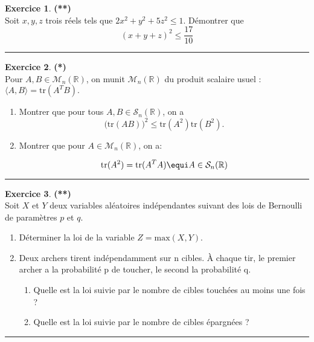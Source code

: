 \documentclass[a4paper,11pt]{article}
\theoremstyle{definition}
\newtheorem{exo}{Exercice} %
\begin{document}
\begin{exo}\textbf{(**)}\quad\\[0.25cm]%
	Soit $x,y,z$ trois réels tels que $2x^2+y^2+5z^2\leq 1$. Démontrer que $$(x+y+z)^2\leq\frac {17}{10}$$
	
	\centering
	\rule{1\linewidth}{0.6pt}
\end{exo}
\newpage 

\begin{exo}\textbf{(*)}\quad\\[0.25cm]%
	Pour $A,B\in\mathcal M_n(\mathbb R)$, on munit $\mathcal M_n(\mathbb R)$ du produit scalaire usuel : $ \displaystyle \langle A,B\rangle=\textrm{tr}(A^T B).$
	\begin{enumerate}
		\item Montrer que pour tous $A,B\in\mathcal S_n(\mathbb R)$, on a
		$$\big(\textrm{tr}(AB)\big)^2\leq \textrm{tr}(A^2)\textrm{tr}(B^2).$$
		\item Montrer que pour $A\in \mathcal M_n(\mathbb R)$, on a:
		
		$$\textrm{tr}(A^2) = \textrm{tr}(A^TA)  \equi A\in\mathcal S_n(\mathbb R)$$
	\end{enumerate}
	
	\centering
	\rule{1\linewidth}{0.6pt}
\end{exo}


\begin{exo}\textbf{(**)}\quad\\[0.25cm]%
	Soit $X$ et $Y$ deux variables aléatoires indépendantes suivant des lois de
	Bernoulli de paramètres $p$ et $q $.
	\begin{enumerate}
		\item Déterminer la loi de la variable
		$Z = \text{max}(X, Y )$.
		\item Deux archers tirent indépendamment sur n cibles. À chaque tir, le premier archer
		a la probabilité p de toucher, le second la probabilité q.
		\begin{enumerate}
			\item Quelle est la loi suivie par le nombre de cibles touchées au moins une fois ?
			\item Quelle est la loi suivie par le nombre de cibles épargnées ?
			
		\end{enumerate}
	\end{enumerate} 

	
	\centering
	\rule{1\linewidth}{0.6pt}
\end{exo}


	
\end{document}
